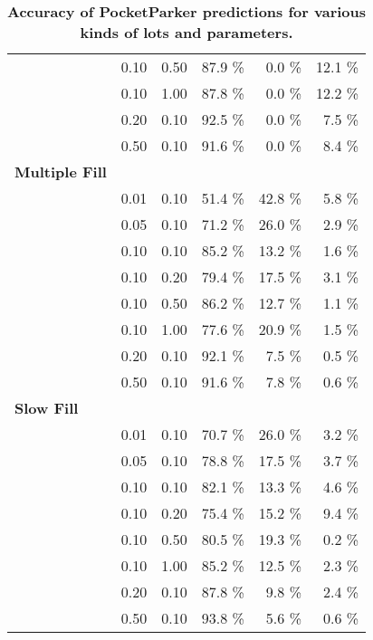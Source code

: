 \begin{table}[t]
\begin{threeparttable}
{\begin{tabularx}{\columnwidth}{Xrrrrr}
& 0.10 & 0.50 & 87.9 \% & 0.0 \% & 12.1 \% \\
& 0.10 & 1.00 & 87.8 \% & 0.0 \% & 12.2 \% \\
& 0.20 & 0.10 & 92.5 \% & 0.0 \% & 7.5 \% \\
& 0.50 & 0.10 & 91.6 \% & 0.0 \% & 8.4 \% \\
\textbf{Multiple Fill} & & & & & \\
\midrule
& 0.01 & 0.10 & 51.4 \% & 42.8 \% & 5.8 \% \\
& 0.05 & 0.10 & 71.2 \% & 26.0 \% & 2.9 \% \\
& 0.10 & 0.10 & 85.2 \% & 13.2 \% & 1.6 \% \\
& 0.10 & 0.20 & 79.4 \% & 17.5 \% & 3.1 \% \\
& 0.10 & 0.50 & 86.2 \% & 12.7 \% & 1.1 \% \\
& 0.10 & 1.00 & 77.6 \% & 20.9 \% & 1.5 \% \\
& 0.20 & 0.10 & 92.1 \% & 7.5 \% & 0.5 \% \\
& 0.50 & 0.10 & 91.6 \% & 7.8 \% & 0.6 \% \\
\textbf{Slow Fill} & & & & & \\
\midrule
& 0.01 & 0.10 & 70.7 \% & 26.0 \% & 3.2 \% \\
& 0.05 & 0.10 & 78.8 \% & 17.5 \% & 3.7 \% \\
& 0.10 & 0.10 & 82.1 \% & 13.3 \% & 4.6 \% \\
& 0.10 & 0.20 & 75.4 \% & 15.2 \% & 9.4 \% \\
& 0.10 & 0.50 & 80.5 \% & 19.3 \% & 0.2 \% \\
& 0.10 & 1.00 & 85.2 \% & 12.5 \% & 2.3 \% \\
& 0.20 & 0.10 & 87.8 \% & 9.8 \% & 2.4 \% \\
& 0.50 & 0.10 & 93.8 \% & 5.6 \% & 0.6 \% \\
\end{tabularx}
}
\caption{\textbf{Accuracy of PocketParker predictions for various kinds of lots and parameters.}}
\label{table-accuracy}
\end{threeparttable}
\end{table}
